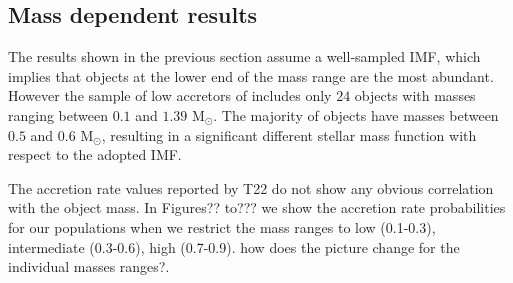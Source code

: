\documentclass[fleqn,usenatbib,letters]{mnras}
\begin{document}



\subsection{Mass dependent results}

The results shown in the previous section assume a well-sampled IMF, which implies that objects at the lower end of the mass range are the most abundant. However the sample of low accretors of \citet{Thanathibodee2023} includes only $24$ objects with masses ranging between $0.1$ and $1.39$ M$_\odot$. The majority of objects have masses between $0.5$ and $0.6$ M$_\odot$, resulting in a significant different stellar mass function with respect to the adopted IMF. %

The accretion rate values reported by T22 do not show any obvious correlation with the object mass. 
In Figures?? to??? we show the accretion rate probabilities for our populations when we restrict the mass ranges to low (0.1-0.3), intermediate (0.3-0.6), high (0.7-0.9). 
{\color{red} how does the picture change for the individual masses ranges?}.
\end{document}
